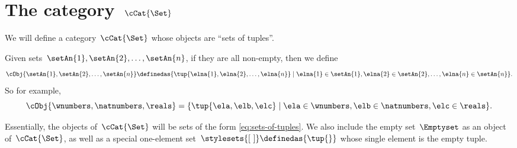 
\section{The category~$\cCat{\Set}$}
\label{sec:cartcatset}

We will define a category~$\cCat{\Set}$ whose objects are ``sets of tuples''.

%
%
%

Given sets~$\setAn{1}, \setAn{2}, \ldots , \setAn{n}$, if they are all non-empty, then we define
\begin{equation}
    \label{eq:sets-of-tuples}
    \cObj{\setAn{1}, \setAn{2}, \ldots, \setAn{n}} \definedas \{ \tup{\elna{1}, \elna{2}, \ldots, \elna{n}} \mid \elna{1} \in \setAn{1}, \elna{2} \in \setAn{2}, \ldots, \elna{n} \in \setAn{n} \}.
\end{equation}
So for example,
\begin{equation*}
    \cObj{\wnumbers, \natnumbers, \reals} = \{ \tup{\ela, \elb, \elc} \mid \ela \in \wnumbers, \elb \in \natnumbers, \elc \in \reals \}.
\end{equation*}

Essentially, the objects of~$\cCat{\Set}$ will be sets of the form \cref{eq:sets-of-tuples}.
We also include the empty set~$\Emptyset$ as an object of~$\cCat{\Set}$, as well as a special one-element set~$\stylesets{[ \ ]} \definedas \{ \tup{} \}$ whose single element is the empty tuple.

